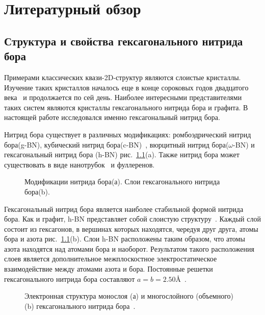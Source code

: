 \chapter{Литературный обзор} \label{chapt1}

\section{Структура и свойства гексагонального  нитрида бора} \label{sect1_1}
Примерами классических квази-2D-структур являются слоистые кристаллы.
Изучение таких кристаллов началось еще в конце сороковых годов
двадцатого века~\cite{Wallace1947} и продолжается по сей день.
Наиболее интересными представителями таких систем являются кристаллы
гексагонального нитрида бора и графита. В настоящей работе исследовался
именно гексагональный нитрид бора.


Нитрид бора существует в различных модификациях: ромбоэдрический нитрид
бора(g-BN), кубический нитрид бора(c-BN)~\cite{Litvinov1998},
вюрцитный нитрид бора($\omega$-BN) и гексагональный нитрид бора
(h-BN) рис.~\ref{pic:BN_forms}(a). Также нитрид бора может существовать в виде нанотрубок~\cite{YZhi2009}
и фуллеренов.
\begin{figure}[!ht]
\caption{Модификации нитрида бора(а). 
Слои гексагонального нитрида бора(b).}
\label{pic:BN_forms}
\end{figure}


Гексагональный нитрид бора является наиболее стабильной формой нитрида
бора. Как и графит, h-BN представляет собой слоистую структуру~\cite{
Neumann1995,Doni1969}. Каждый слой состоит из гексагонов, в вершинах
которых находятся, чередуя друг друга, атомы бора и азота рис.~\ref{pic:BN_forms}(b). Слои h-BN расположены таким образом, что атомы азота
находятся над атомами бора и наоборот. Результатом такого расположения слоев 
является дополнительное межплоскостное электростатическое взаимодействие
между атомами азота и бора. Постоянные решетки гексагонального нитрида
бора составляют $a=b=2.50\si{\angstrom}$~\cite{Paszkowicz2001}. 
\begin{figure}[!ht]
\caption{Электронная структура монослоя (а) и многослойного (объемного) (b)
гексагонального нитрида бора~\cite{Ooi2006}.}
\label{pic:BN_electronic_structure}
\end{figure}


